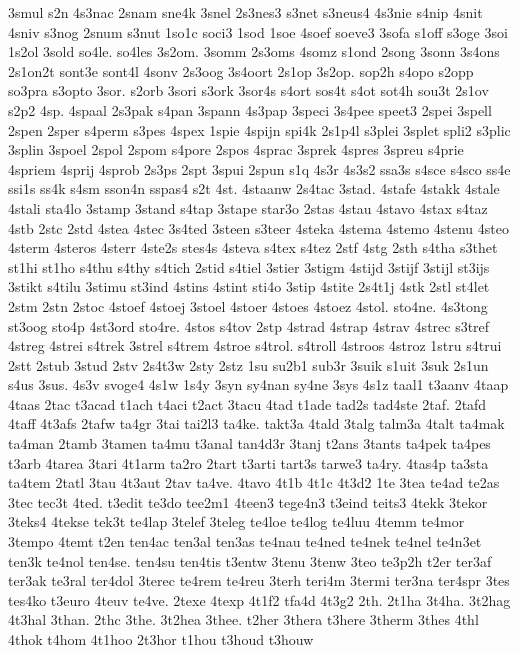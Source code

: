 {3smul
s2n
4s3nac
2snam
sne4k
3snel
2s3nes3
s3net
s3neus4
4s3nie
s4nip
4snit
4sniv
s3nog
2snum
s3nut
1so1c
soci3
1sod
1soe
4soef
soeve3
3sofa
s1off
s3oge
3soi
1s2ol
3sold
so4le.
so4les
3s2om.
3somm
2s3oms
4somz
s1ond
2song
3sonn
3s4ons
2s1on2t
sont3e
sont4l
4sonv
2s3oog
3s4oort
2s1op
3s2op.
sop2h
s4opo
s2opp
so3pra
s3opto
3sor.
s2orb
3sori
s3ork
3sor4s
s4ort
sos4t
s4ot
sot4h
sou3t
2s1ov
s2p2
4sp.
4spaal
2s3pak
s4pan
3spann
4s3pap
3speci
3s4pee
speet3
2spei
3spell
2spen
2sper
s4perm
s3pes
4spex
1spie
4spijn
spi4k
2s1p4l
s3plei
3splet
spli2
s3plic
3splin
3spoel
2spol
2spom
s4pore
2spos
4sprac
3sprek
4spres
3spreu
s4prie
4spriem
4sprij
4sprob
2s3ps
2spt
3spui
2spun
s1q
4s3r
4s3s2
ssa3s
s4sce
s4sco
ss4e
ssi1s
ss4k
s4sm
sson4n
sspas4
s2t
4st.
4staanw
2s4tac
3stad.
4stafe
4stakk
4stale
4stali
sta4lo
3stamp
3stand
s4tap
3stape
star3o
2stas
4stau
4stavo
4stax
s4taz
4stb
2stc
2std
4stea
4stec
3s4ted
3steen
s3teer
4steka
4stema
4stemo
4stenu
4steo
4sterm
4steros
4sterr
4ste2s
stes4s
4steva
s4tex
s4tez
2stf
4stg
2sth
s4tha
s3thet
st1hi
st1ho
s4thu
s4thy
s4tich
2stid
s4tiel
3stier
3stigm
4stijd
3stijf
3stijl
st3ijs
3stikt
s4tilu
3stimu
st3ind
4stins
4stint
sti4o
3stip
4stite
2s4t1j
4stk
2stl
st4let
2stm
2stn
2stoc
4stoef
4stoej
3stoel
4stoer
4stoes
4stoez
4stol.
sto4ne.
4s3tong
st3oog
sto4p
4st3ord
sto4re.
4stos
s4tov
2stp
4strad
4strap
4strav
4strec
s3tref
4streg
4strei
s4trek
3strel
s4trem
4stroe
s4trol.
s4troll
4stroos
4stroz
1stru
s4trui
2stt
2stub
3stud
2stv
2s4t3w
2sty
2stz
1su
su2b1
sub3r
3suik
s1uit
3suk
2s1un
s4us
3sus.
4s3v
svoge4
4s1w
1s4y
3syn
sy4nan
sy4ne
3sys
4s1z
taal1
t3aanv
4taap
4taas
2tac
t3acad
t1ach
t4aci
t2act
3tacu
4tad
t1ade
tad2s
tad4ste
2taf.
2tafd
4taff
4t3afs
2tafw
ta4gr
3tai
tai2l3
ta4ke.
takt3a
4tald
3talg
talm3a
4talt
ta4mak
ta4man
2tamb
3tamen
ta4mu
t3anal
tan4d3r
3tanj
t2ans
3tants
ta4pek
ta4pes
t3arb
4tarea
3tari
4t1arm
ta2ro
2tart
t3arti
tart3s
tarwe3
ta4ry.
4tas4p
ta3sta
ta4tem
2tatl
3tau
4t3aut
2tav
ta4ve.
4tavo
4t1b
4t1c
4t3d2
1te
3tea
te4ad
te2as
3tec
tec3t
4ted.
t3edit
te3do
tee2m1
4teen3
tege4n3
t3eind
teits3
4tekk
3tekor
3teks4
4tekse
tek3t
te4lap
3telef
3teleg
te4loe
te4log
te4luu
4temm
te4mor
3tempo
4temt
t2en
ten4ac
ten3al
ten3as
te4nau
te4ned
te4nek
te4nel
te4n3et
ten3k
te4nol
ten4se.
ten4su
ten4tis
t3entw
3tenu
3tenw
3teo
te3p2h
t2er
ter3af
ter3ak
te3ral
ter4dol
3terec
te4rem
te4reu
3terh
teri4m
3termi
ter3na
ter4spr
3tes
tes4ko
t3euro
4teuv
te4ve.
2texe
4texp
4t1f2
tfa4d
4t3g2
2th.
2t1ha
3t4ha.
3t2hag
4t3hal
3than.
2thc
3the.
3t2hea
3thee.
t2her
3thera
t3here
3therm
3thes
4thl
4thok
t4hom
4t1hoo
2t3hor
t1hou
t3houd
t3houw
}
